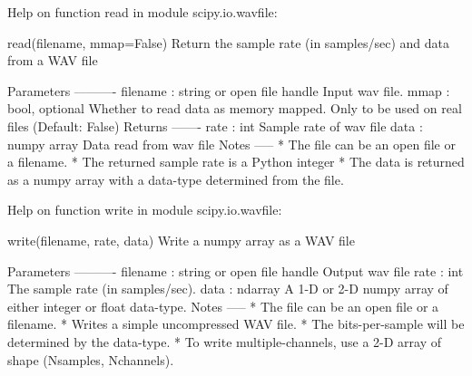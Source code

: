 \documentclass[10pt,fleqn]{article} %
\begin{document}
\ifprof
\else
\newpage

\begin{python}
Help on function read in module scipy.io.wavfile:

read(filename, mmap=False)
    Return the sample rate (in samples/sec) and data from a WAV file    

    Parameters
    ----------
    filename : string or open file handle
        Input wav file.
    mmap : bool, optional
        Whether to read data as memory mapped.
        Only to be used on real files (Default: False)
    Returns
    -------
    rate : int
        Sample rate of wav file
    data : numpy array
        Data read from wav file    
    Notes
    -----    
    * The file can be an open file or a filename.
    * The returned sample rate is a Python integer
    * The data is returned as a numpy array with a
      data-type determined from the file.  
\end{python}

\begin{python}
Help on function write in module scipy.io.wavfile:

write(filename, rate, data)
    Write a numpy array as a WAV file
    
    Parameters
    ----------
    filename : string or open file handle
        Output wav file
    rate : int
        The sample rate (in samples/sec).
    data : ndarray
        A 1-D or 2-D numpy array of either integer or float data-type.    
    Notes
    -----
    * The file can be an open file or a filename.
    * Writes a simple uncompressed WAV file.
    * The bits-per-sample will be determined by the data-type.
    * To write multiple-channels, use a 2-D array of shape
      (Nsamples, Nchannels).  
\end{python}
\fi

\ifprof

\begin{python}

\end{python}
\else
\fi
\end{document}
